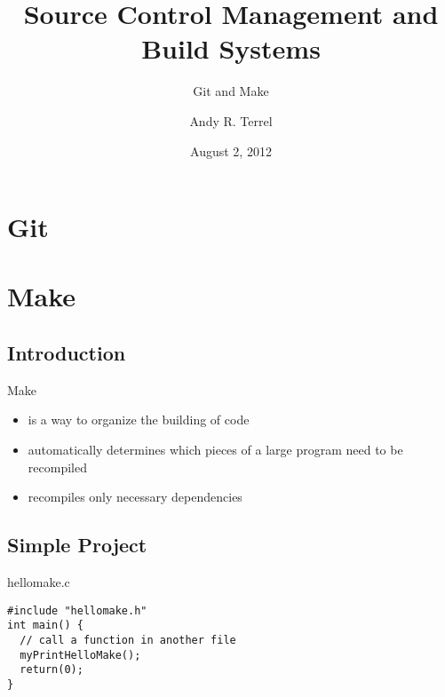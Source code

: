 \documentclass{beamer}
\title{Source Control Management and Build Systems}
\subtitle{Git and Make}
\author{Andy R. Terrel}
\institute{The Texas Advanced Computing Center}
\date{August 2, 2012}  %
\begin{document}
\begin{frame}
  \titlepage
\end{frame}



\section{Git}





\section{Make}
\begin{frame}
  \tableofcontents[currentsection]
\end{frame}


\subsection{Introduction}
\begin{frame}
Make

\begin{itemize}
\item is a way to organize the building of code
\item automatically determines which pieces of a large program need to be recompiled
\item recompiles only necessary dependencies
\end{itemize}
\end{frame}

\subsection{Simple Project}

\lstset{language=C}
\begin{frame}[fragile]
\begin{block}{hellomake.c}
\begin{lstlisting}
#include "hellomake.h"
int main() {
  // call a function in another file
  myPrintHelloMake();
  return(0);
}
\end{lstlisting}
\end{block}
\end{frame}
\end{document}
